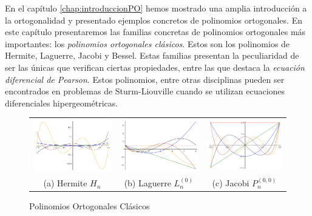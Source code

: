 


En el capítulo \ref{chap:introduccionPO} hemos mostrado una amplia introducción a la ortogonalidad y presentado ejemplos concretos de polinomios ortogonales. En este capítulo presentaremos las familias concretas de polinomios ortogonales más importantes: los \textit{polinomios ortogonales clásicos}. Estos son los polinomios de Hermite, Laguerre, Jacobi y Bessel. Estas familias presentan la peculiaridad de ser las únicas que verifican ciertas propiedades, entre las que destaca la \textit{ecuación diferencial de Pearson}. Estos polinomios, entre otras disciplinas pueden ser encontrados en problemas de Sturm-Liouville cuando se utilizan ecuaciones diferenciales hipergeométricas.

\begin{figure}[h]
    \centering
    \begin{tabular}{ccc}
        \includegraphics[width=5cm]{img/C2/hermite.png} & 
        \includegraphics[width=5cm]{img/C2/laguerre.png} &
        \includegraphics[width=5cm]{img/C2/jacobi.png} \\
        (a) Hermite $H_n$ & (b) Laguerre $L^{(0)}_n$ & (c) Jacobi $P^{(0,0)}_n$ 
    \end{tabular}
    \caption{Polinomios Ortogonales Clásicos}
    \label{img:graficas-clasicos}
\end{figure}

